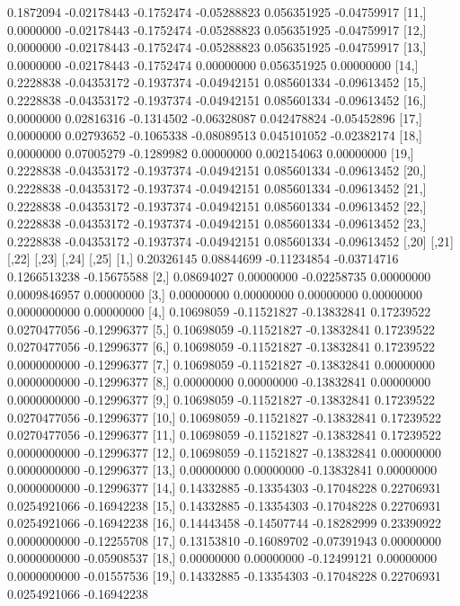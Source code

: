 \documentclass[a4paper]{article}
\begin{document}
\begin{Schunk}
\begin{Soutput}
[10,] 0.1872094 -0.02178443 -0.1752474 -0.05288823 0.056351925 -0.04759917
[11,] 0.0000000 -0.02178443 -0.1752474 -0.05288823 0.056351925 -0.04759917
[12,] 0.0000000 -0.02178443 -0.1752474 -0.05288823 0.056351925 -0.04759917
[13,] 0.0000000 -0.02178443 -0.1752474  0.00000000 0.056351925  0.00000000
[14,] 0.2228838 -0.04353172 -0.1937374 -0.04942151 0.085601334 -0.09613452
[15,] 0.2228838 -0.04353172 -0.1937374 -0.04942151 0.085601334 -0.09613452
[16,] 0.0000000  0.02816316 -0.1314502 -0.06328087 0.042478824 -0.05452896
[17,] 0.0000000  0.02793652 -0.1065338 -0.08089513 0.045101052 -0.02382174
[18,] 0.0000000  0.07005279 -0.1289982  0.00000000 0.002154063  0.00000000
[19,] 0.2228838 -0.04353172 -0.1937374 -0.04942151 0.085601334 -0.09613452
[20,] 0.2228838 -0.04353172 -0.1937374 -0.04942151 0.085601334 -0.09613452
[21,] 0.2228838 -0.04353172 -0.1937374 -0.04942151 0.085601334 -0.09613452
[22,] 0.2228838 -0.04353172 -0.1937374 -0.04942151 0.085601334 -0.09613452
[23,] 0.2228838 -0.04353172 -0.1937374 -0.04942151 0.085601334 -0.09613452
           [,20]       [,21]       [,22]       [,23]        [,24]       [,25]
 [1,] 0.20326145  0.08844699 -0.11234854 -0.03714716 0.1266513238 -0.15675588
 [2,] 0.08694027  0.00000000 -0.02258735  0.00000000 0.0009846957  0.00000000
 [3,] 0.00000000  0.00000000  0.00000000  0.00000000 0.0000000000  0.00000000
 [4,] 0.10698059 -0.11521827 -0.13832841  0.17239522 0.0270477056 -0.12996377
 [5,] 0.10698059 -0.11521827 -0.13832841  0.17239522 0.0270477056 -0.12996377
 [6,] 0.10698059 -0.11521827 -0.13832841  0.17239522 0.0000000000 -0.12996377
 [7,] 0.10698059 -0.11521827 -0.13832841  0.00000000 0.0000000000 -0.12996377
 [8,] 0.00000000  0.00000000 -0.13832841  0.00000000 0.0000000000 -0.12996377
 [9,] 0.10698059 -0.11521827 -0.13832841  0.17239522 0.0270477056 -0.12996377
[10,] 0.10698059 -0.11521827 -0.13832841  0.17239522 0.0270477056 -0.12996377
[11,] 0.10698059 -0.11521827 -0.13832841  0.17239522 0.0000000000 -0.12996377
[12,] 0.10698059 -0.11521827 -0.13832841  0.00000000 0.0000000000 -0.12996377
[13,] 0.00000000  0.00000000 -0.13832841  0.00000000 0.0000000000 -0.12996377
[14,] 0.14332885 -0.13354303 -0.17048228  0.22706931 0.0254921066 -0.16942238
[15,] 0.14332885 -0.13354303 -0.17048228  0.22706931 0.0254921066 -0.16942238
[16,] 0.14443458 -0.14507744 -0.18282999  0.23390922 0.0000000000 -0.12255708
[17,] 0.13153810 -0.16089702 -0.07391943  0.00000000 0.0000000000 -0.05908537
[18,] 0.00000000  0.00000000 -0.12499121  0.00000000 0.0000000000 -0.01557536
[19,] 0.14332885 -0.13354303 -0.17048228  0.22706931 0.0254921066 -0.16942238

\end{Soutput}
\end{Schunk}
\end{document}
